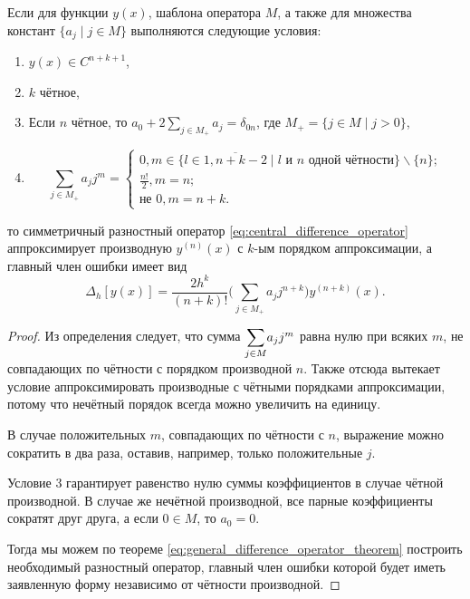 \documentclass[../main.tex]{subfile}
\begin{document}
\begin{theorem}
	Если для функции $y(x)$, шаблона оператора $M$, а также для множества
	констант $\{a_j\mid j\in M\}$ выполняются следующие условия:
	\begin{enumerate}[noitemsep]
		\item $y(x)\in C^{n+k+1}$,
		\item $k$ чётное,
		\item Если $n$ чётное, то $a_0+2\sum_{j\in M_+}a_j=\delta_{0n}$,
			где $M_+=\{j\in M\mid j>0\}$,
		\item	\begin{equation*}
				\sum_{j\in M_+}a_jj^m=
				\begin{cases}
					0, m\in \{l\in\overline{1,n+k-2}\mid l
						\text{ и }n\text{ одной
						чётности}\}\backslash\{n\}; \\
					\frac{n!}{2}, m=n; \\
					\text{не } 0, m=n+k.
				\end{cases}
			\end{equation*}
	\end{enumerate}
	то симметричный разностный оператор
	\eqref{eq:central_difference_operator} аппроксимирует производную
	$y^{(n)}(x)$ с $k$-ым порядком аппроксимации, а главный член ошибки
	имеет вид
	\[\Delta_h[y(x)]=\frac{2h^k}{(n+k)!}\Big(\sum_{j\in M_+}a_jj^{n+k}\Big)
	y^{(n+k)}(x).\]
\end{theorem}

\begin{proof}
	Из определения следует, что сумма $\mathlarger\sum_{j\in M}a_jj^m$ равна
	нулю при всяких $m$, не совпадающих по чётности с порядком производной
	$n$. Также отсюда вытекает условие аппроксимировать производные с
	чётными порядками аппроксимации, потому что нечётный порядок всегда
	можно увеличить на единицу.

	В случае положительных $m$, совпадающих по чётности с $n$, выражение
	можно сократить в два раза, оставив, например, только положительные $j$.

	Условие 3 гарантирует равенство нулю суммы коэффициентов в случае чётной
	производной. В случае же нечётной производной, все парные коэффициенты
	сократят друг друга, а если $0\in M$, то $a_0=0$.
	
	Тогда мы можем  по теореме \eqref{eq:general_difference_operator_theorem}
	построить необходимый разностный оператор, главный член ошибки которой
	будет иметь заявленную форму независимо от чётности производной.
\end{proof}
\end{document}
